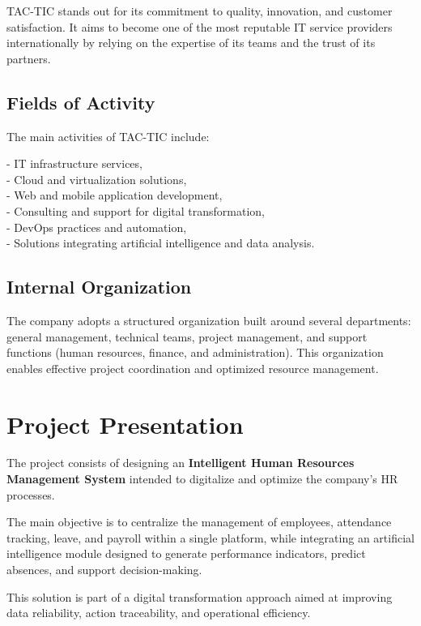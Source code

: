 TAC-TIC stands out for its commitment to quality, innovation, and customer satisfaction. It aims to become one of the most reputable IT service providers internationally by relying on the expertise of its teams and the trust of its partners.

\subsection{Fields of Activity}

The main activities of TAC-TIC include:

- IT infrastructure services,\\
- Cloud and virtualization solutions,\\
- Web and mobile application development,\\
- Consulting and support for digital transformation,\\
- DevOps practices and automation,\\
- Solutions integrating artificial intelligence and data analysis.

\subsection{Internal Organization}

The company adopts a structured organization built around several departments: general management, technical teams, project management, and support functions (human resources, finance, and administration). This organization enables effective project coordination and optimized resource management.

\section{Project Presentation}

The project consists of designing an \textbf{Intelligent Human Resources Management System} intended to digitalize and optimize the company’s HR processes.

The main objective is to centralize the management of employees, attendance tracking, leave, and payroll within a single platform, while integrating an artificial intelligence module designed to generate performance indicators, predict absences, and support decision-making.

This solution is part of a digital transformation approach aimed at improving data reliability, action traceability, and operational efficiency.

